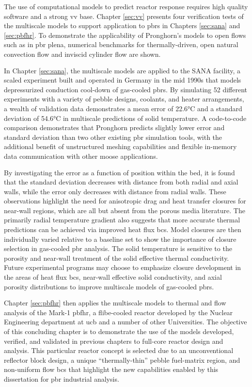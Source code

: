 The use of computational models to predict reactor response requires high quality software and a strong \gls{vv} base. Chapter \ref{sec:vv} presents four verification tests of the multiscale models to support application to \glspl{pbr} in Chapters \ref{sec:sana} and \ref{sec:pbfhr}. To demonstrate the applicability of Pronghorn's models to open flows such as in \gls{pbr} plena, numerical benchmarks for thermally-driven, open natural convection flow and inviscid cylinder flow are shown.

In Chapter \ref{sec:sana}, the multiscale models are applied to the SANA facility, a scaled experiment built and operated in Germany in the mid 1990s that models depressurized conduction cool-down of gas-cooled \glspl{pbr}. By simulating 52 different experiments with a variety of pebble designs, coolants, and heater arrangements, a wealth of validation data demonstrates a mean error of 22.6\si{\celsius} and a standard deviation of 54.6\si{\celsius} in multiscale predictions of solid temperature. A code-to-code comparison demonstrates that Pronghorn predicts slightly lower error and standard deviation than two other existing \gls{pbr} simulation tools, with the additional benefit of unstructured meshing capabilities and flexible in-memory data communication with other \gls{moose} applications.

By investigating the error as a function of position within the bed, it is found that the standard deviation decreases with distance from both radial and axial walls, while the error only decreases with distance from radial walls. These observations highlight the need for anisotropic drag and heat transfer closures for near-wall regions, which are all but absent from the porous media literature. The primarily radial temperature gradient also suggests that more accurate thermal predictions can be achieved via improved heat flux \glspl{bc}. Model closures are then individually varied relative to a baseline set to show the importance of closure selection in gas-cooled \gls{pbr} analysis. The solid temperature is sensitive to the porosity and near-wall treatment of the solid effective thermal conductivity. Future experimental programs may choose to emphasize closure development in the areas of heat flux \glspl{bc}, near-wall effective solid conductivity, and axial porosity distributions to improve multiscale models of gas-cooled \glspl{pbr}.

Chapter \ref{sec:pbfhr} then applies the multiscale models to thermal and flow analysis of the Mark-1 \gls{pbfhr}, a \gls{flibe}-cooled reactor developed by the Nuclear Engineering department at \gls{ucb} and a number of other Universities. The objective of this concluding chapter is to demonstrate the use of the models developed, verified, and validated in previous chapters to full-core reactor design and analysis. This particular reactor concept is selected due to an unconventional reflector block design, a unique ``thermally-thin'' pebble fuel-matrix region, and non-uniform flow \glspl{bc} that highlight the new capabilities enabled by this dissertation for \gls{pbr} industrial analysis.

